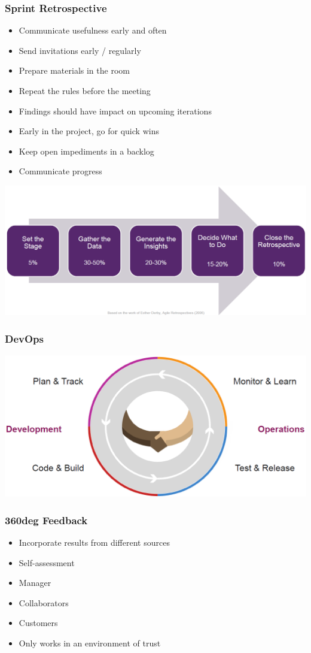 \subsubsection{Sprint Retrospective}
\begin{itemize}
    \item Communicate usefulness early and often
    \item Send invitations early / regularly
    \item Prepare materials in the room
    \item Repeat the rules before the meeting
    \item Findings should have impact on upcoming iterations
    \item Early in the project, go for quick wins
    \item Keep open impediments in a backlog
    \item Communicate progress
\end{itemize}
\includegraphics[width=\linewidth]{../img/sprint_retrospective.png}

\subsubsection{DevOps}
\includegraphics[width=0.7\linewidth]{../img/devops.png}

\subsubsection{360deg Feedback}
\begin{itemize}
    \item Incorporate results from different sources
    \item Self-assessment
    \item Manager
    \item Collaborators
    \item Customers
    \item Only works in an environment of trust
\end{itemize}

